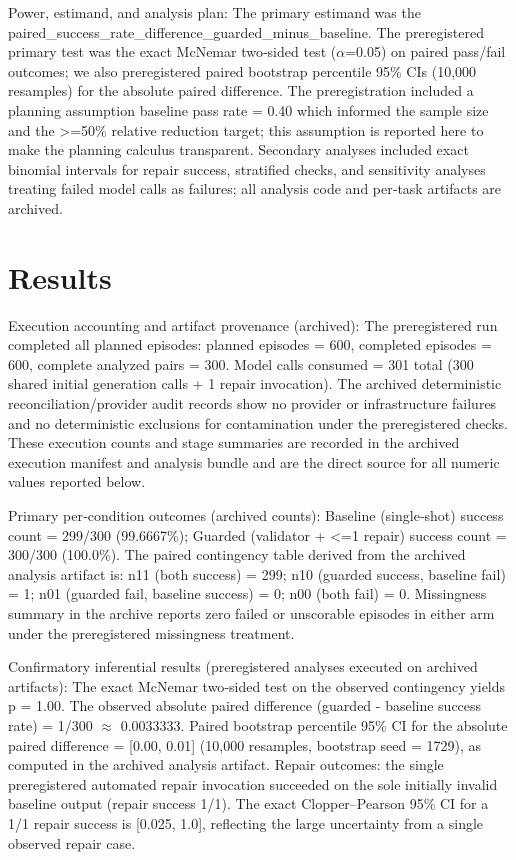 \documentclass[conference]{IEEEtran}
\begin{document}
Power, estimand, and analysis plan: The primary estimand was the paired\_success\_rate\_difference\_guarded\_minus\_baseline. The preregistered primary test was the exact McNemar two‑sided test (\ensuremath{\alpha}=0.05) on paired pass/fail outcomes; we also preregistered paired bootstrap percentile 95\% CIs (10,000 resamples) for the absolute paired difference. The preregistration included a planning assumption baseline pass rate = 0.40 which informed the sample size and the >=50\% relative reduction target; this assumption is reported here to make the planning calculus transparent. Secondary analyses included exact binomial intervals for repair success, stratified checks, and sensitivity analyses treating failed model calls as failures; all analysis code and per‑task artifacts are archived.

\section{Results}
Execution accounting and artifact provenance (archived): The preregistered run completed all planned episodes: planned episodes = 600, completed episodes = 600, complete analyzed pairs = 300. Model calls consumed = 301 total (300 shared initial generation calls + 1 repair invocation). The archived deterministic reconciliation/provider audit records show no provider or infrastructure failures and no deterministic exclusions for contamination under the preregistered checks. These execution counts and stage summaries are recorded in the archived execution manifest and analysis bundle and are the direct source for all numeric values reported below.

Primary per‑condition outcomes (archived counts): Baseline (single‑shot) success count = 299/300 (99.6667\%); Guarded (validator + <=1 repair) success count = 300/300 (100.0\%). The paired contingency table derived from the archived analysis artifact is: n11 (both success) = 299; n10 (guarded success, baseline fail) = 1; n01 (guarded fail, baseline success) = 0; n00 (both fail) = 0. Missingness summary in the archive reports zero failed or unscorable episodes in either arm under the preregistered missingness treatment.

Confirmatory inferential results (preregistered analyses executed on archived artifacts): The exact McNemar two‑sided test on the observed contingency yields p = 1.00. The observed absolute paired difference (guarded - baseline success rate) = 1/300 \ensuremath{\approx} 0.0033333. Paired bootstrap percentile 95\% CI for the absolute paired difference = [0.00, 0.01] (10,000 resamples, bootstrap seed = 1729), as computed in the archived analysis artifact. Repair outcomes: the single preregistered automated repair invocation succeeded on the sole initially invalid baseline output (repair success 1/1). The exact Clopper--Pearson 95\% CI for a 1/1 repair success is [0.025, 1.0], reflecting the large uncertainty from a single observed repair case.
\end{document}
